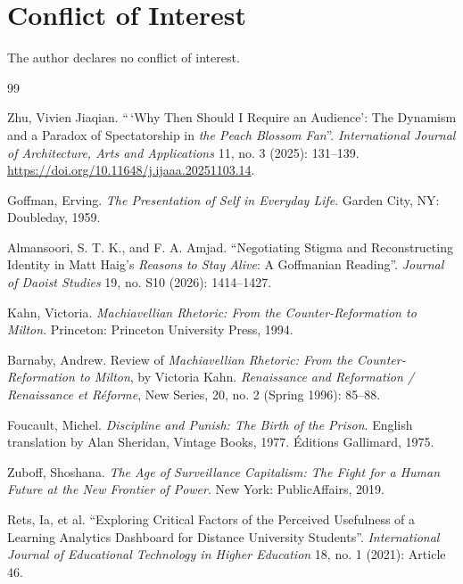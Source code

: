 \documentclass[10pt]{article}
\begin{document}
\newpage
\section*{Conflict of Interest}
The author declares no conflict of interest.

\begin{thebibliography}{99}
\setlength{\itemsep}{0.6em}

 Zhu, Vivien Jiaqian. ``\,`Why Then Should I Require an Audience': The Dynamism and a Paradox of Spectatorship in \emph{the Peach Blossom Fan}''. \emph{International Journal of Architecture, Arts and Applications} 11, no. 3 (2025): 131--139. \url{https://doi.org/10.11648/j.ijaaa.20251103.14}.

 Goffman, Erving. \emph{The Presentation of Self in Everyday Life}. Garden City, NY: Doubleday, 1959.

 Almansoori, S. T. K., and F. A. Amjad. ``Negotiating Stigma and Reconstructing Identity in Matt Haig's \emph{Reasons to Stay Alive}: A Goffmanian Reading''. \emph{Journal of Daoist Studies} 19, no. S10 (2026): 1414--1427.

 Kahn, Victoria. \emph{Machiavellian Rhetoric: From the Counter-Reformation to Milton}. Princeton: Princeton University Press, 1994.

 Barnaby, Andrew. Review of \emph{Machiavellian Rhetoric: From the Counter-Reformation to Milton}, by Victoria Kahn. \emph{Renaissance and Reformation / Renaissance et R\'eforme}, New Series, 20, no. 2 (Spring 1996): 85--88.

 Foucault, Michel. \emph{Discipline and Punish: The Birth of the Prison}. English translation by Alan Sheridan, Vintage Books, 1977. \'Editions Gallimard, 1975.


 Zuboff, Shoshana. \emph{The Age of Surveillance Capitalism: The Fight for a Human Future at the New Frontier of Power}. New York: PublicAffairs, 2019.

 Rets, Ia, et al. ``Exploring Critical Factors of the Perceived Usefulness of a Learning Analytics Dashboard for Distance University Students''. \emph{International Journal of Educational Technology in Higher Education} 18, no. 1 (2021): Article 46.


\end{thebibliography}
\end{document}

